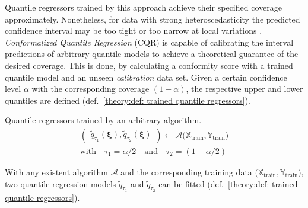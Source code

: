 Quantile regressors trained by this approach achieve their specified coverage approximately. 
Nonetheless, for data with strong heteroscedasticity the predicted confidence interval may be too
tight or too narrow at local variations \cite{romano2019cqr}. \emph{Conformalized Quantile Regression}
(CQR) is capable of calibrating the interval predictions of arbitrary quantile models to achieve
a theoretical guarantee of the desired coverage. This is done, by calculating a conformity score with a
trained quantile model and an unseen \emph{calibration} data set. Given a certain confidence level $\alpha$
with the corresponding coverage $(1-\alpha)$,
the respective upper and lower quantiles are defined (def.~\ref{theory:def: trained quantile regressors}).
\begin{definition} Quantile regressors trained by an arbitrary algorithm.
    \label{theory:def: trained quantile regressors}
    \[
    \begin{gathered}
        \begin{pmatrix}
            \tilde{q}_{\tau_1}(\bm{\xi}), \tilde{q}_{\tau_2}(\bm{\xi})
        \end{pmatrix} \leftarrow
        \mathcal{A} \big (\mathbb{X}_\text{train}, \mathbb{Y}_\text{train} \big) \\
        \text{with} \quad \tau_1 = \alpha/2 \quad \text{and} \quad \tau_2 = (1 - \alpha/2)
    \end{gathered}
    \]
\end{definition}
\noindent
With any existent algorithm $\mathcal{A}$ and the corresponding training data $\big (\mathbb{X}_\text{train}, \mathbb{Y}_\text{train} \big)$,
two quantile regression models $\tilde{q}_{\tau_1}$ and $\tilde{q}_{\tau_2}$ can be fitted (def.~\ref{theory:def: trained quantile regressors}).

